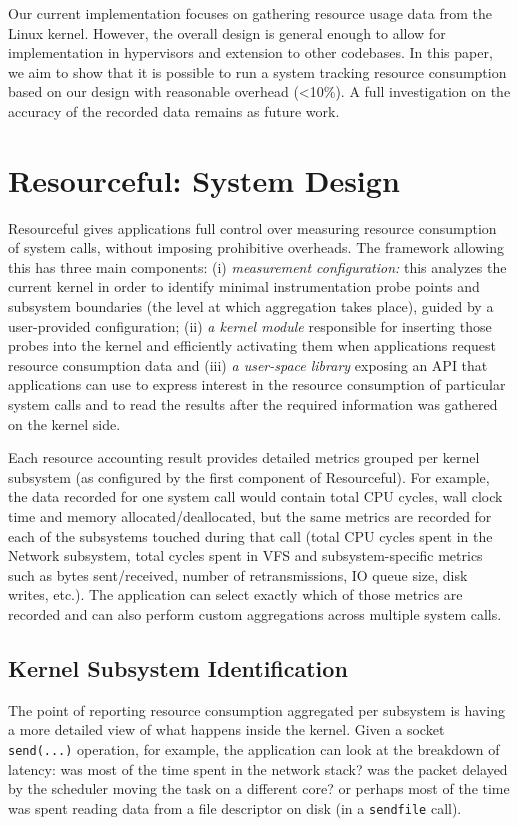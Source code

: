 \documentclass[letterpaper,twocolumn,10pt]{article}
\newcommand{\pname}{Resourceful}
\begin{document}
Our current implementation focuses on gathering resource usage data from the
Linux kernel.  However, the overall design is general enough to allow for
implementation in hypervisors and extension to other codebases. 
In this paper, we aim to show that it is possible to run a system tracking
resource consumption based on our design with reasonable overhead (\textless 10\%). A
full investigation on the accuracy of the recorded data remains as future work.


\section{\pname: System Design} 

\pname{ }gives applications full control over measuring resource consumption of
system calls, without imposing prohibitive overheads. The framework allowing
this has three main components: (i) \textit{measurement configuration:} this
analyzes the current kernel in order to identify minimal instrumentation probe
points and subsystem boundaries (the level at which aggregation takes place),
guided by a user-provided configuration; (ii) \textit{a kernel module} responsible for
inserting those probes into the kernel and efficiently activating them when
applications request resource consumption data and (iii) \textit{a user-space library}
exposing an API that applications can use to express interest in the resource
consumption of particular system calls and to read the results after the
required information was gathered on the kernel side.

Each resource accounting result provides detailed metrics grouped per kernel
subsystem (as configured by the first component of \pname). For example, the data recorded
for one system call would contain total CPU cycles, wall clock time and memory
allocated/deallocated, but the same metrics are recorded for each of the
subsystems touched during that call (total CPU cycles spent in the Network
subsystem, total cycles spent in VFS and subsystem-specific metrics such as
bytes sent/received, number of retransmissions, IO queue size, disk writes,
etc.). The application can select exactly which of those metrics are recorded
and can also perform custom aggregations across multiple system calls.

\subsection{Kernel Subsystem Identification}
The point of reporting resource consumption aggregated per subsystem is having a
more detailed view of what happens inside the kernel. Given a socket
\texttt{send(...)} operation, for example, the application can look at the
breakdown of latency: was most of the time spent in the network stack? was the
packet delayed by the scheduler moving the task on a different core? or perhaps
most of the time was spent reading data from a file descriptor on disk (in a 
\texttt{sendfile} call).
 
\end{document}
